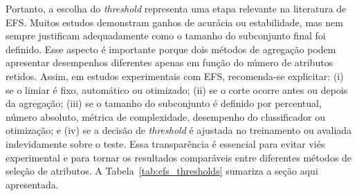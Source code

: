 Portanto, a escolha do \textit{threshold} representa uma etapa relevante na literatura de EFS. Muitos estudos demonstram ganhos de acurácia ou estabilidade, mas nem sempre justificam adequadamente como o tamanho do subconjunto final foi definido. Esse aspecto é importante porque dois métodos de agregação podem apresentar desempenhos diferentes apenas em função do número de atributos retidos. Assim, em estudos experimentais com EFS, recomenda-se explicitar: (i) se o limiar é fixo, automático ou otimizado; (ii) se o corte ocorre antes ou depois da agregação; (iii) se o tamanho do subconjunto é definido por percentual, número absoluto, métrica de complexidade, desempenho do classificador ou otimização; e (iv) se a decisão de \textit{threshold} é ajustada no treinamento ou avaliada indevidamente sobre o teste. Essa transparência é essencial para evitar viés experimental e para tornar os resultados comparáveis entre diferentes métodos de seleção de atributos. A Tabela~\ref{tab:efs_thresholds} sumariza a seção aqui apresentada.

